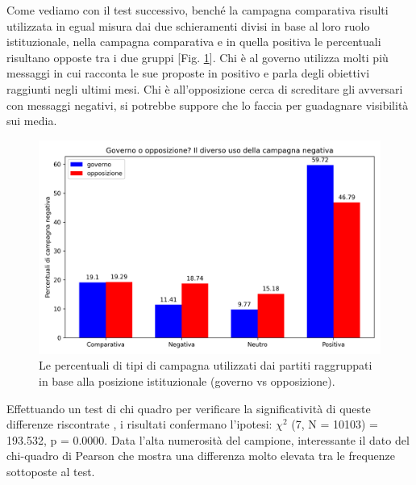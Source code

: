 Come vediamo con il test successivo, benché la campagna comparativa risulti utilizzata in egual misura dai due schieramenti divisi in base al loro ruolo istituzionale, nella campagna comparativa e in quella positiva le percentuali risultano opposte tra i due gruppi [Fig. \ref{fig:governo}]. Chi è al governo utilizza molti più messaggi in cui racconta le sue proposte in positivo e parla degli obiettivi raggiunti negli ultimi mesi. Chi è all'opposizione cerca di screditare gli avversari con messaggi negativi, si potrebbe suppore che lo faccia per guadagnare visibilità sui media.
\begin{figure}
	\includegraphics[width=\textwidth]{figures/governo}
	\caption{Le percentuali di tipi di campagna utilizzati dai partiti raggruppati in base alla posizione istituzionale (governo vs opposizione).}
	\label{fig:governo}
\end{figure}
%  

Effettuando un test di chi quadro per verificare la significatività di queste differenze riscontrate , i risultati confermano l'ipotesi: $\chi^{2}$ (7, N = 10103) = 193.532, p = 0.0000. Data l'alta numerosità del campione, interessante il dato del chi-quadro di Pearson che mostra una differenza molto elevata tra le frequenze sottoposte al test.


